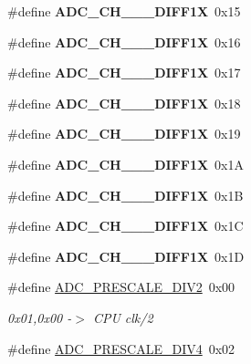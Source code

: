 \begin{CompactItemize}
\item 
\hypertarget{group__a2d_g85a30293d96db3700b4b9be90c0fbb33}{
\#define \textbf{ADC\_\-CH\_\_\_\-DIFF1X}~0x15}
\label{group__a2d_g85a30293d96db3700b4b9be90c0fbb33}

\item 
\hypertarget{group__a2d_g4c657e2d57628fa1985d2ff38e165314}{
\#define \textbf{ADC\_\-CH\_\_\_\-DIFF1X}~0x16}
\label{group__a2d_g4c657e2d57628fa1985d2ff38e165314}

\item 
\hypertarget{group__a2d_g7f35bdea141f9aa32a07f4cb1d0ccd86}{
\#define \textbf{ADC\_\-CH\_\_\_\-DIFF1X}~0x17}
\label{group__a2d_g7f35bdea141f9aa32a07f4cb1d0ccd86}

\item 
\hypertarget{group__a2d_ga7bf0c13604c130feb76935e177124bb}{
\#define \textbf{ADC\_\-CH\_\_\_\-DIFF1X}~0x18}
\label{group__a2d_ga7bf0c13604c130feb76935e177124bb}

\item 
\hypertarget{group__a2d_gad51db92aecbfe211871a3099d7fbd7e}{
\#define \textbf{ADC\_\-CH\_\_\_\-DIFF1X}~0x19}
\label{group__a2d_gad51db92aecbfe211871a3099d7fbd7e}

\item 
\hypertarget{group__a2d_g71ceaea7dd64c28705ccdc84c09f9e48}{
\#define \textbf{ADC\_\-CH\_\_\_\-DIFF1X}~0x1A}
\label{group__a2d_g71ceaea7dd64c28705ccdc84c09f9e48}

\item 
\hypertarget{group__a2d_g13d286d6aa04046617a96eef9804c40a}{
\#define \textbf{ADC\_\-CH\_\_\_\-DIFF1X}~0x1B}
\label{group__a2d_g13d286d6aa04046617a96eef9804c40a}

\item 
\hypertarget{group__a2d_ga2fd7fa7726846b7399e0a9e8ca8254a}{
\#define \textbf{ADC\_\-CH\_\_\_\-DIFF1X}~0x1C}
\label{group__a2d_ga2fd7fa7726846b7399e0a9e8ca8254a}

\item 
\hypertarget{group__a2d_g92a15defe2e018615ed50b8e756d960c}{
\#define \textbf{ADC\_\-CH\_\_\_\-DIFF1X}~0x1D}
\label{group__a2d_g92a15defe2e018615ed50b8e756d960c}

\item 
\hypertarget{group__a2d_g94b219194cddc9869031a936b94bf536}{
\#define \hyperlink{group__a2d_g94b219194cddc9869031a936b94bf536}{ADC\_\-PRESCALE\_\-DIV2}~0x00}
\label{group__a2d_g94b219194cddc9869031a936b94bf536}

\begin{CompactList}\small\item\em 0x01,0x00 -$>$ CPU clk/2 \item\end{CompactList}\item 
\hypertarget{group__a2d_g03ae0e14f20d17c74a4a539b7522328a}{
\#define \hyperlink{group__a2d_g03ae0e14f20d17c74a4a539b7522328a}{ADC\_\-PRESCALE\_\-DIV4}~0x02}
\label{group__a2d_g03ae0e14f20d17c74a4a539b7522328a}


\end{CompactItemize}
